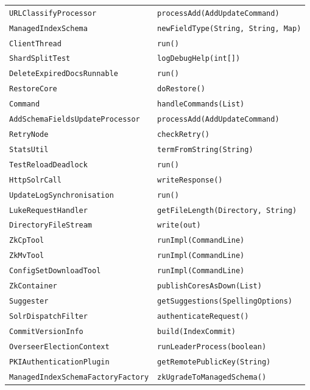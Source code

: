 \begin{center}
\begin{longtable}{ll}
\lstinline/URLClassifyProcessor/&{\lstinline/processAdd(AddUpdateCommand)/}\\
\lstinline/ManagedIndexSchema/&{\lstinline/newFieldType(String, String, Map)/}\\
\lstinline/ClientThread/&{\lstinline/run()/}\\
\lstinline/ShardSplitTest/&{\lstinline/logDebugHelp(int[])/}\\
\lstinline/DeleteExpiredDocsRunnable/&{\lstinline/run()/}\\
\lstinline/RestoreCore/&{\lstinline/doRestore()/}\\
\lstinline/Command/&{\lstinline/handleCommands(List)/}\\
\lstinline/AddSchemaFieldsUpdateProcessor/&{\lstinline/processAdd(AddUpdateCommand)/}\\
\lstinline/RetryNode/&{\lstinline/checkRetry()/}\\
\lstinline/StatsUtil/&{\lstinline/termFromString(String)/}\\
\lstinline/TestReloadDeadlock/&{\lstinline/run()/}\\
\lstinline/HttpSolrCall/&{\lstinline/writeResponse()/}\\
\lstinline/UpdateLogSynchronisation/&{\lstinline/run()/}\\
\lstinline/LukeRequestHandler/&{\lstinline/getFileLength(Directory, String)/}\\
\lstinline/DirectoryFileStream/&{\lstinline/write(out)/}\\
\lstinline/ZkCpTool/&{\lstinline/runImpl(CommandLine)/}\\
\lstinline/ZkMvTool/&{\lstinline/runImpl(CommandLine)/}\\
\lstinline/ConfigSetDownloadTool/&{\lstinline/runImpl(CommandLine)/}\\
\lstinline/ZkContainer/&{\lstinline/publishCoresAsDown(List)/}\\
\lstinline/Suggester/&{\lstinline/getSuggestions(SpellingOptions)/}\\
\lstinline/SolrDispatchFilter/&{\lstinline/authenticateRequest()/}\\
\lstinline/CommitVersionInfo/&{\lstinline/build(IndexCommit)/}\\
\lstinline/OverseerElectionContext/&{\lstinline/runLeaderProcess(boolean)/}\\
\lstinline/PKIAuthenticationPlugin/&{\lstinline/getRemotePublicKey(String)/}\\
\lstinline/ManagedIndexSchemaFactoryFactory/&{\lstinline/zkUgradeToManagedSchema()/}\\

\end{longtable}
\end{center}
